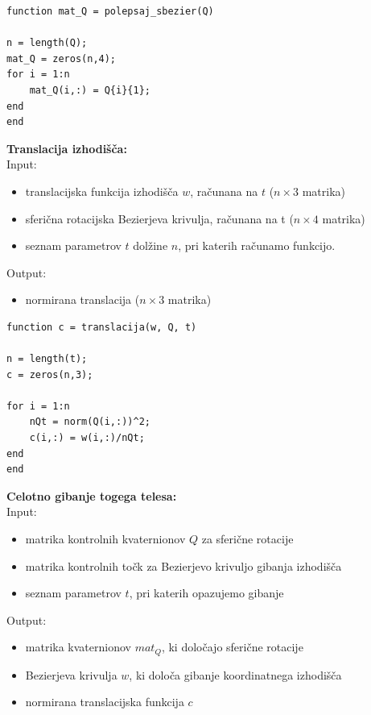 \documentclass[12pt,a4paper,twoside]{article}
\theoremstyle{definition} %
\theoremstyle{plain} %
\numberwithin{equation}{section}  %
\begin{document}
\begin{lstlisting}[caption = {polepsaj\_sbezier}]
function mat_Q = polepsaj_sbezier(Q)

n = length(Q);
mat_Q = zeros(n,4);
for i = 1:n
    mat_Q(i,:) = Q{i}{1};
end
end
\end{lstlisting}

\vspace{1cm}
\textbf{Translacija izhodišča:}\\
Input:
\begin{itemize}
\item translacijska funkcija izhodišča $w$, računana na $t$ ($n \times 3$ matrika)
\item sferična rotacijska Bezierjeva krivulja, računana na t ($n \times 4$ matrika)
\item seznam parametrov $t$ dolžine $n$, pri katerih računamo funkcijo.
\end{itemize}
Output:
\begin{itemize}
\item normirana translacija ($n \times 3$ matrika)
\end{itemize}

\begin{lstlisting}[caption = {translacija}]
function c = translacija(w, Q, t)

n = length(t);
c = zeros(n,3);

for i = 1:n
    nQt = norm(Q(i,:))^2;
    c(i,:) = w(i,:)/nQt;
end
end
\end{lstlisting}

\newpage

\textbf{Celotno gibanje togega telesa:}\\
Input:
\begin{itemize}
\item matrika kontrolnih kvaternionov $Q$ za sferične rotacije
\item matrika kontrolnih točk za Bezierjevo krivuljo gibanja izhodišča
\item seznam parametrov $t$, pri katerih opazujemo gibanje
\end{itemize}
Output:
\begin{itemize}
\item matrika kvaternionov $mat_Q$, ki določajo sferične rotacije
\item Bezierjeva krivulja $w$, ki določa gibanje koordinatnega izhodišča
\item normirana translacijska funkcija $c$
\end{itemize}
\end{document}
